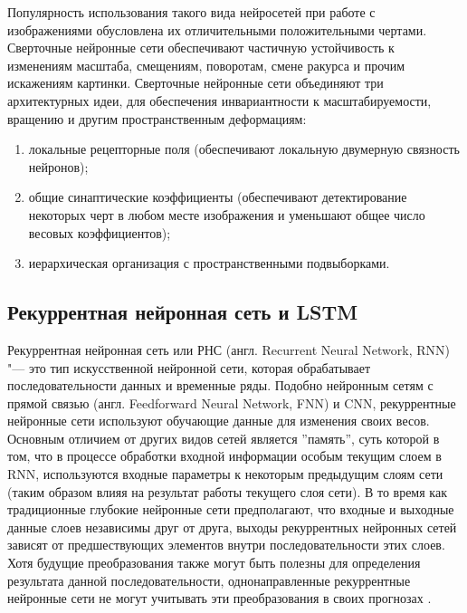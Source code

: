 \documentclass[bachelor, och, coursework]{SCWorks}
\begin{document}
        Популярность использования такого вида нейросетей при работе с
        изображениями обусловлена их отличительными положительными чертами.
        Сверточные нейронные сети обеспечивают частичную устойчивость к
        изменениям масштаба, смещениям, поворотам, смене ракурса и прочим
        искажениям картинки. Сверточные нейронные сети объединяют три
        архитектурных идеи, для обеспечения инвариантности к масштабируемости,
        вращению и другим пространственным деформациям:

        \begin{enumerate}
            \item
                локальные рецепторные поля (обеспечивают локальную двумерную
                связность нейронов);
            \item
                общие синаптические коэффициенты (обеспечивают детектирование
                некоторых черт в любом месте изображения и уменьшают общее число
                весовых коэффициентов);
            \item
                иерархическая организация с пространственными подвыборками.
        \end{enumerate}

    \subsection{Рекуррентная нейронная сеть и LSTM}

        Рекуррентная нейронная сеть или РНС (англ. Recurrent Neural Network,
        RNN) "--- это тип искусственной нейронной сети, которая обрабатывает
        последовательности данных и временные ряды. Подобно нейронным сетям с
        прямой связью (англ. Feedforward Neural Network, FNN) и CNN,
        рекуррентные нейронные сети используют обучающие данные для изменения
        своих весов. Основным отличием от других видов сетей является
        ''память'', суть которой в том, что в процессе обработки входной
        информации особым текущим слоем в RNN, используются входные параметры к
        некоторым предыдущим слоям сети (таким образом влияя на результат работы
        текущего слоя сети). В то время как традиционные глубокие нейронные сети
        предполагают, что входные и выходные данные слоев независимы друг от
        друга, выходы рекуррентных нейронных сетей зависят от предшествующих
        элементов внутри последовательности этих слоев. Хотя будущие
        преобразования также могут быть полезны для определения результата
        данной последовательности, однонаправленные рекуррентные нейронные сети
        не могут учитывать эти преобразования в своих прогнозах \cite{rnn1}.
\end{document}
